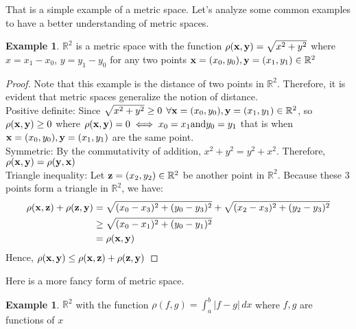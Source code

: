\documentclass[12pt, reqno]{amsart}
\theoremstyle{definition}
\newtheorem{example}[theorem]{Example}
\numberwithin{equation}{section}
\newcommand{\dR}{{\mathbb R}}
\newcommand{\tabb}{\hspace*{1cm}}
\begin{document}
    That is a simple example of a metric space.  Let's analyze some common examples to have a better understanding of metric spaces.
    \begin{example} \label{norm-induced metric}
        $\dR^2$ is a metric space with the function $\rho({\bf x}, {\bf y}) = \sqrt{x^2+y^2}$ where $x=x_1-x_0$, $y=y_1-y_0$ for any two points ${\bf x}=(x_0,y_0), {\bf y}=(x_1, y_1) \in \dR^2$
        \begin{proof} 
        Note that this example is the distance of two points in $\dR^2$. Therefore, it is evident that metric spaces generalize the notion of distance.\\
        Positive definite: Since $\sqrt{x^2+y^2} \geq 0 \hspace{1ex}\forall {\bf x}=(x_0,y_0), {\bf y}=(x_1, y_1) \in \dR^2$, so $\rho({\bf x}, {\bf y}) \geq 0$ where ${\rho({\bf x}, {\bf y}) = 0 \iff x_0=x_1 \text{and} y_0 = y_1}$ that is when ${\bf x}=(x_0,y_0), {\bf y}=(x_1, y_1)$ are the same point.\\
        Symmetric: By the commutativity of addition, ${x^2 + y^2 = y^2 + x^2}$. Therefore, ${\rho({\bf x}, {\bf y}) = \rho({\bf y},{\bf x})}$\\
        Triangle inequality: Let ${\bf z}=(x_2, y_2) \in \dR^2$ be another point in $\dR^2$. Because these 3 points form a triangle in $\dR^2$, we have:
        \begin{align*}
        \rho({\bf x}, {\bf z}) + \rho({\bf z}, {\bf y}) &= \sqrt{(x_0-x_3)^2 + (y_0-y_3)^2} + \sqrt{(x_2-x_3)^2 + (y_2-y_3)^2} \\
                                              &\geq \sqrt{(x_0-x_1)^2+(y_0-y_1)^2}\\
                                              &= \rho({\bf x}, {\bf y})
        \end{align*}
        \tabb Hence, $\rho({\bf x}, {\bf y}) \leq \rho({\bf x}, {\bf z}) + \rho({\bf z}, {\bf y})$
        \end{proof}
    \end{example}
\pagebreak
    Here is a more fancy form of metric space.
    \begin{example}
    $\dR^2$ with the function $\rho(f,g) = \int_{a}^{b} |f-g| \,dx$ where $f,g$ are functions of $x$
    \end{example}
\end{document}
